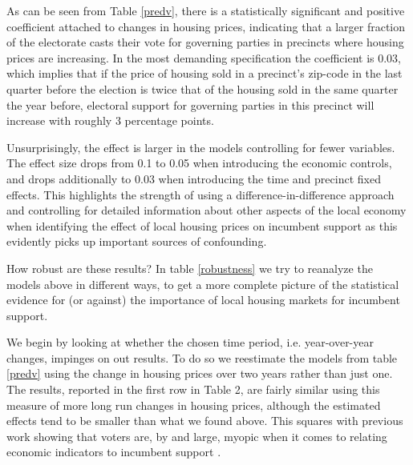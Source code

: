 \documentclass[12pt,a4paper]{article}
\begin{document}
	
	
	As can be seen from Table \ref{predv}, there is a statistically significant and positive coefficient attached to changes in housing prices, indicating that a larger fraction of the electorate casts their vote for governing parties in precincts where housing prices are increasing. In the most demanding specification the coefficient is 0.03,  which implies that if the price of housing sold in a precinct's zip-code in the last quarter before the election is twice that of the housing sold in the same quarter the year before, electoral support for  governing parties in this precinct will increase with roughly 3 percentage points.
	
	Unsurprisingly, the effect is larger in the models controlling for fewer variables. The effect size drops from 0.1 to 0.05 when introducing the economic controls, and drops additionally to 0.03 when introducing the time and precinct fixed effects. This highlights the strength of using a difference-in-difference approach and controlling for detailed information about other aspects of the local economy when identifying the effect of local housing prices on incumbent support as this evidently picks up important sources of confounding.
	
	
	
	How robust are these results? In table \ref{robustness} we try to reanalyze the models above in different ways, to get a more complete picture of the statistical evidence for (or against) the importance of local housing markets for incumbent support.
	
	We begin by looking at whether the chosen time period, i.e. year-over-year changes, impinges on out results. To do so we reestimate the models from table \ref{predv} using the change in housing prices over two years rather than just one. The results, reported in the first row in Table 2, are fairly similar using this measure of more long run changes in housing prices, although the estimated effects tend to be smaller than what we found above. This squares with previous work showing that voters are, by and large, myopic when it comes to relating economic indicators to incumbent support \citep{healy2009myopic,healy2014substituting}.
	
\end{document}
